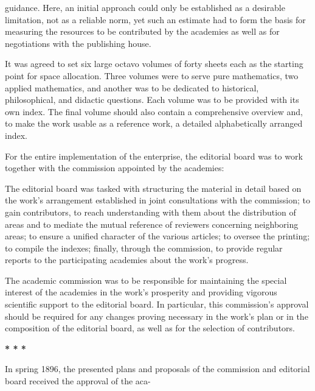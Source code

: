 \thispagestyle{fancy}

\vspace{0.5cm}

guidance. Here, an initial approach could only be established as a desirable limitation, not as a reliable norm, yet such an estimate had to form the basis for measuring the resources to be contributed by the academies as well as for negotiations with the publishing house.

It was agreed to set six large octavo volumes of forty sheets each as the starting point for space allocation. Three volumes were to serve pure mathematics, two applied mathematics, and another was to be dedicated to historical, philosophical, and didactic questions. Each volume was to be provided with its own index. The final volume should also contain a comprehensive overview and, to make the work usable as a reference work, a detailed alphabetically arranged index.

For the entire implementation of the enterprise, the editorial board was to work together with the commission appointed by the academies:

The editorial board was tasked with structuring the material in detail based on the work's arrangement established in joint consultations with the commission; to gain contributors, to reach understanding with them about the distribution of areas and to mediate the mutual reference of reviewers concerning neighboring areas; to ensure a unified character of the various articles; to oversee the printing; to compile the indexes; finally, through the commission, to provide regular reports to the participating academies about the work's progress.

The academic commission was to be responsible for maintaining the special interest of the academies in the work's prosperity and providing vigorous scientific support to the editorial board. In particular, this commission's approval should be required for any changes proving necessary in the work's plan or in the composition of the editorial board, as well as for the selection of contributors.

\vspace{0.5cm}

\centerline{\textbf{* * *}}

\vspace{0.5cm}

In spring 1896, the presented plans and proposals of the commission and editorial board received the approval of the aca-
